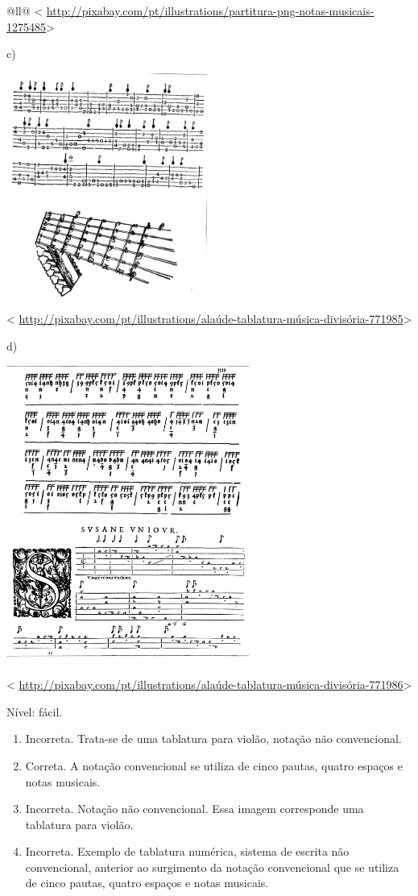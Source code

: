 \begin{itemize}
\begin{itemize}
\begin{escolha}[]{@{}ll@{}}
\textless{}
\url{http://pixabay.com/pt/illustrations/partitura-png-notas-musicais-1275485}\textgreater{}

c)

\includegraphics[width=2.59375in,height=2.88542in]{media/image33.jpeg}

\textless{}
\url{http://pixabay.com/pt/illustrations/alaúde-tablatura-música-divisória-771985}\textgreater{}

d)

\includegraphics[width=3.13542in,height=3.83333in]{media/image34.jpeg}

\textless{}
\url{http://pixabay.com/pt/illustrations/alaúde-tablatura-música-divisória-771986}\textgreater{}

Nível: fácil.

\begin{enumerate}
\def\labelenumi{\alph{enumi})}
\item
  Incorreta. Trata-se de uma tablatura para violão, notação não
  convencional.
\item
  Correta. A notação convencional se utiliza de cinco pautas, quatro
  espaços e notas musicais.
\item
  Incorreta. Notação não convencional. Essa imagem corresponde uma
  tablatura para violão.
\item
  Incorreta. Exemplo de tablatura numérica, sistema de escrita não
  convencional, anterior ao surgimento da notação convencional que se
  utiliza de cinco pautas, quatro espaços e notas musicais.
\end{enumerate}


\end{escolha}
\end{itemize}
\end{itemize}
